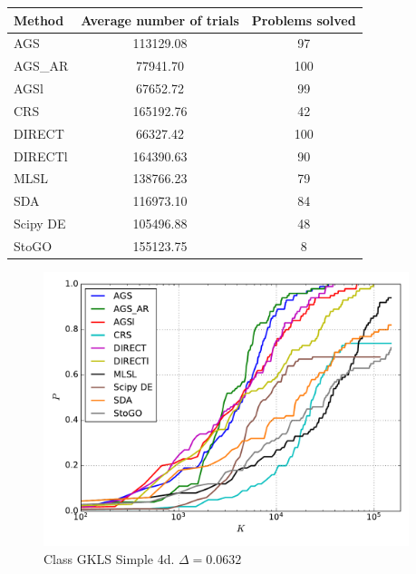 \documentclass[a4paper]{article}
\begin{document}
\begin{tabular}{lcc}
\hline
 Method   &  Average number of trials  &  Problems solved  \\
\hline
 AGS      &         113129.08          &        97         \\
 AGS\_AR   &          77941.70          &        100        \\
 AGSl     &          67652.72          &        99         \\
 CRS      &         165192.76          &        42         \\
 DIRECT   &          66327.42          &        100        \\
 DIRECTl  &         164390.63          &        90         \\
 MLSL     &         138766.23          &        79         \\
 SDA      &         116973.10          &        84         \\
 Scipy DE &         105496.88          &        48         \\
 StoGO    &         155123.75          &         8         \\
\hline
\end{tabular}
\begin{figure}[H]
  \center
  \includegraphics[width=0.95\textwidth]{../experiments/gklss4d_serg/cmc.pdf}
  \caption{Class GKLS Simple 4d. $\Delta=0.0632$}
\end{figure}
\end{document}
